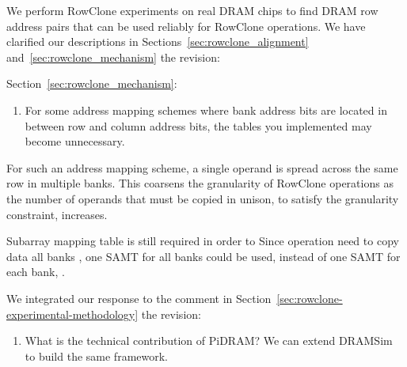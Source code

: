 We perform RowClone experiments on real DRAM chips to find DRAM row address pairs that can be used reliably for RowClone operations. We have clarified our descriptions in Sections~\ref{sec:rowclone_alignment} and~\ref{sec:rowclone_mechanism}  the revision:

\vspace{5pt}
\yyboxbegin 
\yyboxend 

Section~\ref{sec:rowclone_mechanism}:

\vspace{5pt}
\yyboxbegin 
\yyboxend 

\vspace{5pt}
\yyboxbegin 
\yyboxend 

\newpage
\bigbreak
\begin{tcolorbox}
    \begin{enumerate}[label=R2/\arabic*]
        \addtocounter{enumi}{1}
        \item \label{q:r2q2} For some address mapping schemes where bank address bits are located in between row and column address bits, the tables you implemented may become unnecessary.
    \end{enumerate}
\end{tcolorbox} 

For such an address mapping scheme, a single operand is spread across the same row in multiple banks. This coarsens the granularity of RowClone operations as the number of operands that must be copied in unison, to satisfy the granularity constraint, increases. 

Subarray mapping table  is still required in order to  Since  operation need to copy data  all banks , one SAMT for all banks could be used,  instead of one SAMT for each bank, .

We integrated our response to the comment in Section~\ref{sec:rowclone-experimental-methodology}  the revision:

\vspace{5pt}
\yyboxbegin 
\yyboxend 

\bigbreak
\begin{tcolorbox}
    \begin{enumerate}[label=R2/\arabic*]
       \addtocounter{enumi}{2}
        \item \label{q:r2q3} What is the technical contribution of PiDRAM? We can extend DRAMSim to build the same framework.
    \end{enumerate}
\end{tcolorbox} 

